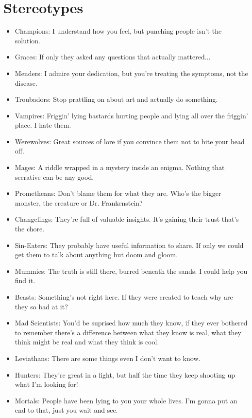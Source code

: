 \section*{Stereotypes}
\begin{itemize}

\item Champions: I understand how you feel, but punching people isn't the solution.
\item Graces: If only they asked any questions that actually mattered...
\item Menders: I admire your dedication, but you're treating the symptoms, not the disease.
\item Troubadors: Stop prattling on about art and actually do something.

\item Vampires: Friggin' lying bastards hurting people and lying all over the friggin' place. I hate them.
\item Werewolves: Great sources of lore if you convince them not to bite your head off.
\item Mages:  A  riddle wrapped in a mystery inside an enigma. Nothing that secrative can be any good. 
\item Prometheans: Don't blame them for what they are. Who's the bigger monster, the creature or Dr. Frankenstein?
\item Changelings: They're full of valuable insights. It's gaining their trust that's the chore.
\item Sin-Eaters: They probably have useful information to share. If only we could get them to talk about anything but doom and gloom.
\item Mummies: The truth is still there, burred beneath the sands. I could help you find it.
\item Beasts: Something's not right here. If they were created to teach why are they so bad at it?
\item Mad Scientists: You'd be suprised how much they know, if they ever bothered to remember there's a difference between what they know is real, what they think might be real and what they think is cool.
\item Leviathans: There are some things even I don't want to know.

\item Hunters: They're great in a fight, but half the time they keep shooting up what I'm looking for!
\item Mortals: People have been lying to you your whole lives. I'm gonna put an end to that, just you wait and see. 

\end{itemize}

